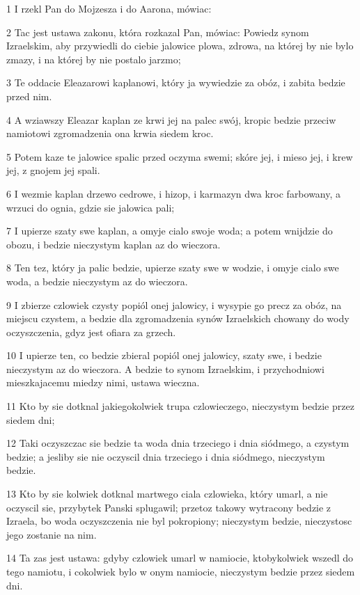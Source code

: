 \par 1 I rzekl Pan do Mojzesza i do Aarona, mówiac:
\par 2 Tac jest ustawa zakonu, która rozkazal Pan, mówiac: Powiedz synom Izraelskim, aby przywiedli do ciebie jalowice plowa, zdrowa, na której by nie bylo zmazy, i na której by nie postalo jarzmo;
\par 3 Te oddacie Eleazarowi kaplanowi, który ja wywiedzie za obóz, i zabita bedzie przed nim.
\par 4 A wziawszy Eleazar kaplan ze krwi jej na palec swój, kropic bedzie przeciw namiotowi zgromadzenia ona krwia siedem kroc.
\par 5 Potem kaze te jalowice spalic przed oczyma swemi; skóre jej, i mieso jej, i krew jej, z gnojem jej spali.
\par 6 I wezmie kaplan drzewo cedrowe, i hizop, i karmazyn dwa kroc farbowany, a wrzuci do ognia, gdzie sie jalowica pali;
\par 7 I upierze szaty swe kaplan, a omyje cialo swoje woda; a potem wnijdzie do obozu, i bedzie nieczystym kaplan az do wieczora.
\par 8 Ten tez, który ja palic bedzie, upierze szaty swe w wodzie, i omyje cialo swe woda, a bedzie nieczystym az do wieczora.
\par 9 I zbierze czlowiek czysty popiól onej jalowicy, i wysypie go precz za obóz, na miejscu czystem, a bedzie dla zgromadzenia synów Izraelskich chowany do wody oczyszczenia, gdyz jest ofiara za grzech.
\par 10 I upierze ten, co bedzie zbieral popiól onej jalowicy, szaty swe, i bedzie nieczystym az do wieczora. A bedzie to synom Izraelskim, i przychodniowi mieszkajacemu miedzy nimi, ustawa wieczna.
\par 11 Kto by sie dotknal jakiegokolwiek trupa czlowieczego, nieczystym bedzie przez siedem dni;
\par 12 Taki oczyszczac sie bedzie ta woda dnia trzeciego i dnia siódmego, a czystym bedzie; a jesliby sie nie oczyscil dnia trzeciego i dnia siódmego, nieczystym bedzie.
\par 13 Kto by sie kolwiek dotknal martwego ciala czlowieka, który umarl, a nie oczyscil sie, przybytek Panski splugawil; przetoz takowy wytracony bedzie z Izraela, bo woda oczyszczenia nie byl pokropiony; nieczystym bedzie, nieczystosc jego zostanie na nim.
\par 14 Ta zas jest ustawa: gdyby czlowiek umarl w namiocie, ktobykolwiek wszedl do tego namiotu, i cokolwiek bylo w onym namiocie, nieczystym bedzie przez siedem dni.
